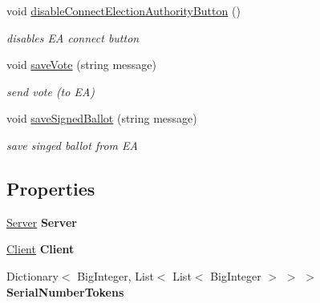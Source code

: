 \begin{DoxyCompactItemize}
void \hyperlink{class_proxy_1_1_proxy_ab3a9063d2aeeee5c52ac5e456884495a}{disable\+Connect\+Election\+Authority\+Button} ()
\begin{DoxyCompactList}\small\item\em disables E\+A connect button \end{DoxyCompactList}\item 
void \hyperlink{class_proxy_1_1_proxy_a157618e263df8cff5cb66f4af4d29101}{save\+Vote} (string message)
\begin{DoxyCompactList}\small\item\em send vote (to E\+A) \end{DoxyCompactList}\item 
void \hyperlink{class_proxy_1_1_proxy_ad4b94d61a35d02c9aebc4a6786fe05af}{save\+Signed\+Ballot} (string message)
\begin{DoxyCompactList}\small\item\em save singed ballot from E\+A \end{DoxyCompactList}\end{DoxyCompactItemize}
\subsection*{Properties}
\begin{DoxyCompactItemize}
\item 
\hypertarget{class_proxy_1_1_proxy_ad4e2d6b5b6f7c3f56ecaede918d73e4d}{}\hyperlink{class_proxy_1_1_server}{Server} {\bfseries Server}\label{class_proxy_1_1_proxy_ad4e2d6b5b6f7c3f56ecaede918d73e4d}

\item 
\hypertarget{class_proxy_1_1_proxy_a1e2b864dc37c87b0c164edfafc757958}{}\hyperlink{class_proxy_1_1_client}{Client} {\bfseries Client}\label{class_proxy_1_1_proxy_a1e2b864dc37c87b0c164edfafc757958}

\item 
\hypertarget{class_proxy_1_1_proxy_a3604bb37c57186075a93299bf19f51bc}{}Dictionary$<$ Big\+Integer, List$<$ List$<$ Big\+Integer $>$ $>$ $>$ {\bfseries Serial\+Number\+Tokens}\label{class_proxy_1_1_proxy_a3604bb37c57186075a93299bf19f51bc}

\end{DoxyCompactItemize}


